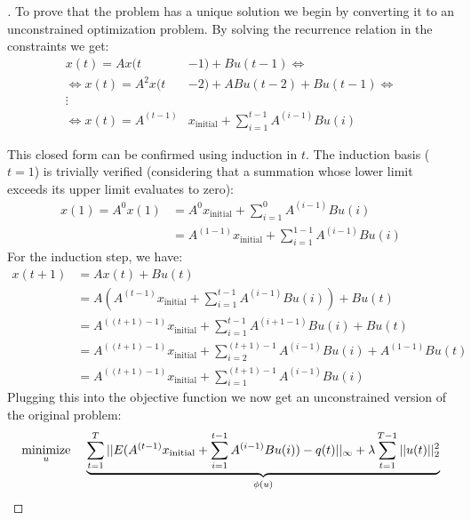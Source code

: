 \documentclass[12pt]{article}
\DeclareMathOperator*{\minimize}{minimize}
\begin{document}
\begin{proof}[\unskip\nopunct]
To prove that the problem has a unique solution we begin by converting it to an unconstrained optimization problem. By solving the recurrence relation in the constraints we get:
\vspace{-0.1em}
\begin{align*}
    x(t)= Ax(t&-1) + Bu(t-1)
    \Leftrightarrow
    \\
    \Leftrightarrow
    x(t)= A^2x(t&-2) + ABu(t-2) + Bu(t-1)
    \Leftrightarrow
    \\
    \vdots
    \\
    \Leftrightarrow 
    x(t)= A^{(t-1)} & x_{\text{initial}} + \sum_{i=1}^{t-1} A^{(i-1)}Bu(i)
\end{align*}

This closed form can be confirmed using induction in $t$. The induction basis ($t = 1$) is trivially verified (considering that a summation whose lower limit exceeds its upper limit evaluates to zero):
\vspace{-0.8em}
\begin{align*}
    x(1) = A^0 x(1) &= A^0 x_{\text{initial}} +  \sum_{i=1}^{0} A^{(i-1)}Bu(i) \\
    &= A^{(1 - 1)} x_{\text{initial}} +  \sum_{i=1}^{1 - 1} A^{(i-1)}Bu(i)
\end{align*}
\vspace{-0.5em}
For the induction step, we have:
\begin{align*}
    x(t + 1) &= Ax(t) + Bu(t) \\
    &= A \left(  A^{(t-1)} x_{\text{initial}} + \sum_{i=1}^{t-1} A^{(i-1)}Bu(i) \right) + Bu(t) \\ 
    &=  A^{((t + 1)-1)} x_{\text{initial}} + \sum_{i=1}^{t-1} A^{(i + 1 -1)}Bu(i) + Bu(t) \\ 
    &= A^{((t + 1)-1)} x_{\text{initial}} + \sum_{i=2}^{(t + 1)-1} A^{(i-1)}Bu(i) + A^{(1 - 1)}Bu(t) \\ 
    &= A^{((t + 1)-1)} x_{\text{initial}} + \sum_{i=1}^{(t + 1)-1} A^{(i-1)}Bu(i)
\end{align*}
Plugging this into the objective function we now get an unconstrained version of the original problem:
\vspace{-0.5em}
\begin{align*}
    \minimize_{u} \hspace{0.4cm} \underbrace{
    \sum_{t=1}^{T} ||E (A^{(t-1)} x_{\text{initial}} + \sum_{i=1}^{t-1} A^{(i-1)} B u(i)) - q(t)||_{\infty} +
    \lambda \sum_{t=1}^{T-1} ||u(t)||_{2}^2}_{\phi(u)}
\end{align*}


\end{proof}
\end{document}
